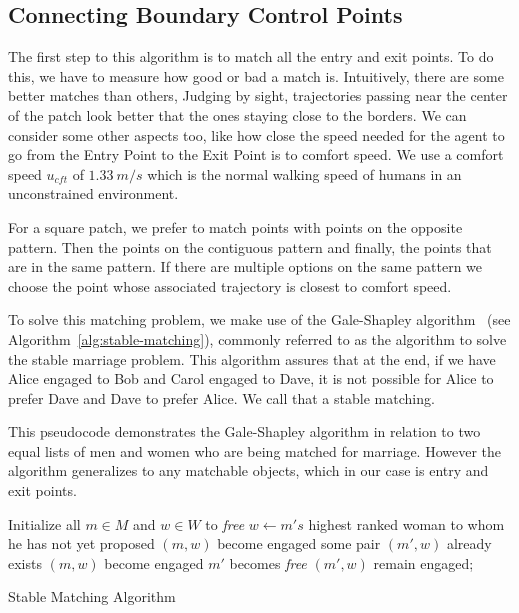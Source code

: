 \subsection{Connecting Boundary Control Points}
\label{sec:method:init}

The first step to this algorithm is to match all the entry and exit points.  To do this, we have to measure how good or bad a match is. Intuitively, there are some better matches than others, Judging by sight, trajectories passing near the center of the patch look better that the ones staying close to the borders. We can consider some other aspects too, like how close the speed needed for the agent to go from the Entry Point to the Exit Point is to comfort speed. We use a comfort speed $u_{cft}$ of $1.33~m/s$ which is the normal walking speed of humans in an unconstrained environment.

For a square patch, we prefer to match points with points on the opposite pattern. Then the points on the contiguous pattern and finally, the points that are in the same pattern. If there are multiple options on the same pattern we choose the point whose associated trajectory is closest to comfort speed.

To solve this matching problem, we make use of the Gale-Shapley algorithm~\cite{gale1962college} (see Algorithm~\ref{alg:stable-matching}), commonly referred to as the algorithm to solve the stable marriage problem.  This algorithm assures that at the end, if we have Alice engaged to Bob and Carol engaged to Dave, it is not possible for Alice to prefer Dave and Dave to prefer Alice. We call that a stable matching.  

This pseudocode demonstrates the Gale-Shapley algorithm in relation to two equal lists of men and women who are being matched for marriage. However the algorithm generalizes to any matchable objects, which in our case is entry and exit points.

\begin{algorithm}[t]

Initialize all $m \in M$ and $w \in W$ to \textit{free} \;
 {
	$w \leftarrow m's$ highest ranked woman to whom he has not yet proposed \;
	{ 
		$(m,w)$ become engaged \;
	}
	{
		some pair $(m',w)$ already exists \;
		{
			$(m,w)$ become engaged \;
			$m'$ becomes \textit{free} \;
		}
		{
			 $(m',w)$ remain engaged;
		}
	}
}
\caption{Stable Matching Algorithm}
\label{alg:stable-matching}
\end{algorithm}


